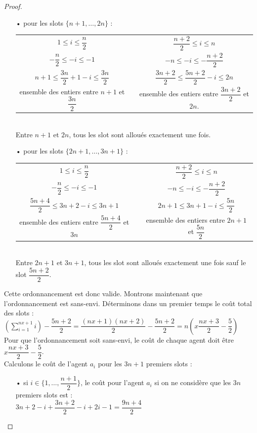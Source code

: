 \documentclass[12pt]{article}
\theoremstyle{definition}
\begin{document}
\begin{itemize}
\begin{proof}
\begin{itemize}
\item[•] pour les slots $\{n+1,\dots,2n\}$ :\\
\begin{tabular}{ccc}
$1\leq i \leq \dfrac{n}{2}$ & & $\dfrac{n+2}{2}\leq i \leq n$\\
$-\dfrac{n}{2}\leq -i\leq -1$ & & $-n\leq -i \leq -\dfrac{n+2}{2}$\\
$n+1 \leq \dfrac{3n}{2}+1-i\leq\dfrac{3n}{2}$ & & $\dfrac{3n+2}{2}\leq \dfrac{5n+2}{2}-i\leq 2n$\\
ensemble des entiers entre $n+1$ et $\dfrac{3n}{2}$ & & ensemble des entiers entre $\dfrac{3n+2}{2}$ et $2n$. 
\end{tabular}\\
Entre $n+1$ et $2n$, tous les slot sont alloués exactement une fois.
\item[•] pour les slots $\{2n+1,\dots,3n + 1\}$ :\\
\begin{tabular}{ccc}
$1\leq i \leq \dfrac{n}{2}$ & & $\dfrac{n+2}{2}\leq i \leq n$\\
$-\dfrac{n}{2}\leq -i\leq -1$ & & $-n\leq -i \leq -\dfrac{n+2}{2}$\\
$\dfrac{5n+4}{2}\leq 3n+2-i\leq 3n+1$ & & $2n+1\leq 3n+1-i \leq \dfrac{5n}{2}$\\
ensemble des entiers entre $\dfrac{5n+4}{2}$ et $3n$ & & ensemble des entiers entre $2n + 1$ et $\dfrac{5n}{2}$
\end{tabular}\\
Entre $2n+1$ et $3n+1$, tous les slot sont alloués exactement une fois sauf le slot $\dfrac{5n+2}{2}$.\\
\end{itemize}
Cette ordonnancement est donc valide. Montrons maintenant que l'ordonnancement est sans-envi. Déterminons dans un premier temps le coût total des slots :\\
$(\sum\limits_{i=1}^{nx+1}i)-\dfrac{5n+2}{2} = 	\dfrac{(nx+1)(nx+2)}{2}-\dfrac{5n+2}{2} = n(x\dfrac{nx+3}{2}-\dfrac{5}{2})$\\
Pour que l'ordonnancement soit sans-envi, le coût de chaque agent doit être $x\dfrac{nx+3}{2}-\dfrac{5}{2}$.\\
Calculons le coût de l'agent $a_i$ pour les $3n+1$ premiers slots :
\begin{itemize}
\item[•] si $i\in \{1,\dots,\dfrac{n+1}{2}\}$, le coût pour l'agent $a_i$ si on ne considère que les $3n$ premiers slots est : \\
$3n+2-i+\dfrac{3n+2}{2}-i+2i-1 = \dfrac{9n+4}{2}$

\end{itemize}
\end{proof}
\end{itemize}
\end{document}

